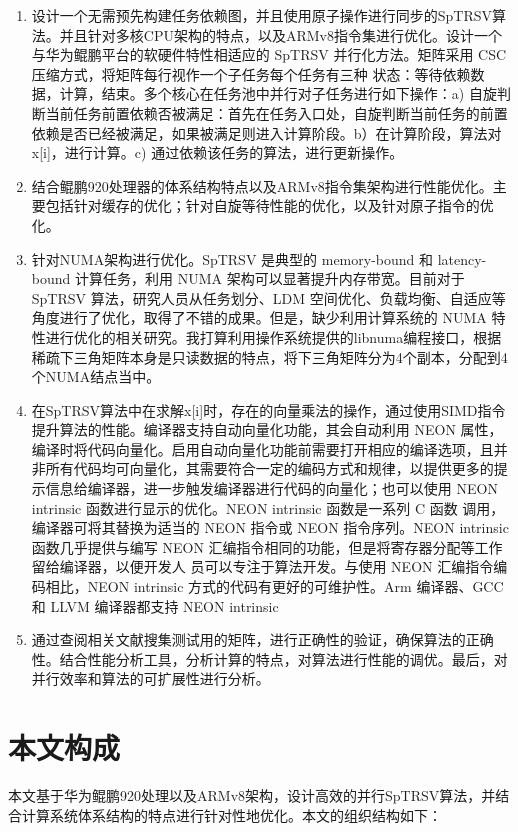 \begin{enumerate} \setlength{\itemsep}{0pt}
    \item 设计一个无需预先构建任务依赖图，并且使用原子操作进行同步的SpTRSV算法。并且针对多核CPU架构的特点，以及ARMv8指令集进行优化。设计一个与华为鲲鹏平台的软硬件特性相适应的 SpTRSV 并行化方法。矩阵采用 CSC 压缩方式，将矩阵每行视作一个子任务每个任务有三种 状态：等待依赖数据，计算，结束。多个核心在任务池中并行对子任务进行如下操作：a) 自旋判断当前任务前置依赖否被满足：首先在任务入口处，自旋判断当前任务的前置依赖是否已经被满足，如果被满足则进入计算阶段。b）在计算阶段，算法对x[i]，进行计算。c) 通过依赖该任务的算法，进行更新操作。
    \item 结合鲲鹏920处理器的体系结构特点以及ARMv8指令集架构进行性能优化。主要包括针对缓存的优化；针对自旋等待性能的优化，以及针对原子指令的优化。
    \item 针对NUMA架构进行优化。SpTRSV 是典型的 memory-bound 和 latency-bound 计算任务，利用 NUMA 架构可以显著提升内存带宽。目前对于 SpTRSV 算法，研究人员从任务划分、LDM 空间优化、负载均衡、自适应等角度进行了优化，取得了不错的成果。但是，缺少利用计算系统的 NUMA 特性进行优化的相关研究。我打算利用操作系统提供的libnuma编程接口，根据稀疏下三角矩阵本身是只读数据的特点，将下三角矩阵分为4个副本，分配到4个NUMA结点当中。
    \item 在SpTRSV算法中在求解x[i]时，存在的向量乘法的操作，通过使用SIMD指令提升算法的性能。编译器支持自动向量化功能，其会自动利用 NEON 属性，编译时将代码向量化。启用自动向量化功能前需要打开相应的编译选项，且并非所有代码均可向量化，其需要符合一定的编码方式和规律，以提供更多的提示信息给编译器，进一步触发编译器进行代码的向量化；也可以使用 NEON intrinsic 函数进行显示的优化。NEON intrinsic 函数是一系列 C 函数 调用，编译器可将其替换为适当的 NEON 指令或 NEON 指令序列。NEON intrinsic 函数几乎提供与编写 NEON 汇编指令相同的功能，但是将寄存器分配等工作留给编译器，以便开发人 员可以专注于算法开发。与使用 NEON 汇编指令编码相比，NEON intrinsic 方式的代码有更好的可维护性。Arm 编译器、GCC 和 LLVM 编译器都支持 NEON intrinsic
    \item 通过查阅相关文献搜集测试用的矩阵，进行正确性的验证，确保算法的正确性。结合性能分析工具，分析计算的特点，对算法进行性能的调优。最后，对并行效率和算法的可扩展性进行分析。
\end{enumerate}

\section{本文构成}

本文基于华为鲲鹏920处理以及ARMv8架构，设计高效的并行SpTRSV算法，并结合计算系统体系结构的特点进行针对性地优化。本文的组织结构如下：


